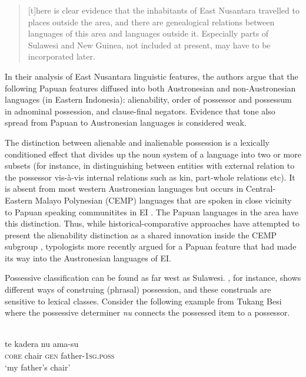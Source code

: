 \begin{quote}[t]here is clear evidence that the inhabitants of East Nusantara travelled to places outside the area, and there are genealogical relations between languages of this area and languages outside it. Especially parts of Sulawesi and New Guinea, not included at present, may have to be incorporated later.\end{quote}

In their analysis of East Nusantara linguistic features, the authors argue that the following Papuan features diffused into both Austronesian and non-Aus\-tro\-ne\-sian languages (in Eastern Indonesia): alienability, order of possessor and possessum in adnominal possession, and clause-final negators. Evidence that tone also spread from Papuan to Austronesian languages is considered weak.

The distinction between alienable and inalienable possession is a lexically conditioned effect that divides up the noun system of a language into two or more subsets (for instance, in distinguishing between entities with external relation to the possessor vis-à-vis internal relations such as kin, part-whole relations etc). It is absent from most western Austronesian languages but occurs in Central-Eastern Malayo Polynesian (CEMP) languages that are spoken in close vicinity to Papuan speaking communitites in EI \citep[116]{klamer2008east}. The Papuan languages in the area have this distinction. Thus, while historical-comparative approaches have attempted to present the alienability distinction as a shared innovation inside the CEMP subgroup \citep{blust1993central}, typologists more recently argued for a Papuan feature that had made its way into the Austronesian languages of EI.  

Possessive classification can be found as far west as Sulawesi. , for instance, shows different ways of construing (phrasal) possession, and these construals are sensitive to lexical classes. Consider the following example from Tukang Besi where the possessive determiner \textit{nu} connects the possessed item to a possessor.

\ea 
{}\\
\gll te kadera nu ama-su\\
\textsc{core} chair \textsc{gen} father-\textsc{1}\textsc{sg}.\textsc{poss}\\
\glt ‘my father's chair’
\z

